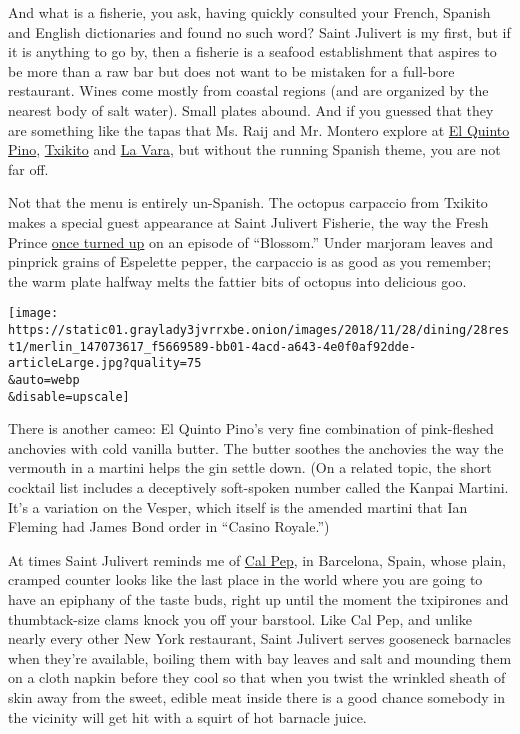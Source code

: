 And what is a fisherie, you ask, having quickly consulted your French,
Spanish and English dictionaries and found no such word? Saint Julivert
is my first, but if it is anything to go by, then a fisherie is a
seafood establishment that aspires to be more than a raw bar but does
not want to be mistaken for a full-bore restaurant. Wines come mostly
from coastal regions (and are organized by the nearest body of salt
water). Small plates abound. And if you guessed that they are something
like the tapas that Ms. Raij and Mr. Montero explore at
\href{https://www.nytimes3xbfgragh.onion/2014/05/14/dining/restaurant-review-el-quinto-pino-in-chelsea.html}{El
Quinto Pino},
\href{https://www.nytimes3xbfgragh.onion/2009/04/22/dining/reviews/22rest.html}{Txikito}
and
\href{https://www.nytimes3xbfgragh.onion/2012/08/22/dining/reviews/la-vara-in-cobble-hill-brooklyn-restaurant-review.html}{La
Vara}, but without the running Spanish theme, you are not far off.

Not that the menu is entirely un-Spanish. The octopus carpaccio from
Txikito makes a special guest appearance at Saint Julivert Fisherie, the
way the Fresh Prince
\href{https://www.youtube.com/watch?v=ekveD9J4vAs}{once turned up} on an
episode of ``Blossom.'' Under marjoram leaves and pinprick grains of
Espelette pepper, the carpaccio is as good as you remember; the warm
plate halfway melts the fattier bits of octopus into delicious goo.

\texttt{[image: https://static01.graylady3jvrrxbe.onion/images/2018/11/28/dining/28rest1/merlin\_147073617\_f5669589-bb01-4acd-a643-4e0f0af92dde-articleLarge.jpg?quality=75\\\&auto=webp\\\&disable=upscale]}

There is another cameo: El Quinto Pino's very fine combination of
pink-fleshed anchovies with cold vanilla butter. The butter soothes the
anchovies the way the vermouth in a martini helps the gin settle down.
(On a related topic, the short cocktail list includes a deceptively
soft-spoken number called the Kanpai Martini. It's a variation on the
Vesper, which itself is the amended martini that Ian Fleming had James
Bond order in ``Casino Royale.'')

At times Saint Julivert reminds me of
\href{https://www.calpep.com/Ingles/index_ing.html}{Cal Pep}, in
Barcelona, Spain, whose plain, cramped counter looks like the last place
in the world where you are going to have an epiphany of the taste buds,
right up until the moment the txipirones and thumbtack-size clams knock
you off your barstool. Like Cal Pep, and unlike nearly every other New
York restaurant, Saint Julivert serves gooseneck barnacles when they're
available, boiling them with bay leaves and salt and mounding them on a
cloth napkin before they cool so that when you twist the wrinkled sheath
of skin away from the sweet, edible meat inside there is a good chance
somebody in the vicinity will get hit with a squirt of hot barnacle
juice.

